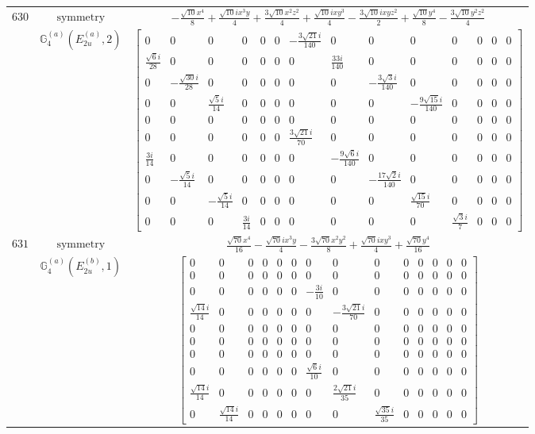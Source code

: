 \documentclass[fleqn,8pt,landscape]{jsarticle}
\begin{document}
\begin{longtable}{ccc}
$ 630 $ & $ \text{symmetry} $ & $ - \frac{\sqrt{10} x^{4}}{8} + \frac{\sqrt{10} i x^{3} y}{4} + \frac{3 \sqrt{10} x^{2} z^{2}}{4} + \frac{\sqrt{10} i x y^{3}}{4} - \frac{3 \sqrt{10} i x y z^{2}}{2} + \frac{\sqrt{10} y^{4}}{8} - \frac{3 \sqrt{10} y^{2} z^{2}}{4} $ \\
$  $ & $ \mathbb{G}_{4}^{(a)}(E_{2u}^{(a)},2) $ & $ \begin{bmatrix} 0 & 0 & 0 & 0 & 0 & 0 & - \frac{3 \sqrt{21} i}{140} & 0 & 0 & 0 & 0 & 0 & 0 & 0 \\ \frac{\sqrt{6} i}{28} & 0 & 0 & 0 & 0 & 0 & 0 & \frac{33 i}{140} & 0 & 0 & 0 & 0 & 0 & 0 \\ 0 & - \frac{\sqrt{30} i}{28} & 0 & 0 & 0 & 0 & 0 & 0 & - \frac{3 \sqrt{3} i}{140} & 0 & 0 & 0 & 0 & 0 \\ 0 & 0 & \frac{\sqrt{5} i}{14} & 0 & 0 & 0 & 0 & 0 & 0 & - \frac{9 \sqrt{15} i}{140} & 0 & 0 & 0 & 0 \\ 0 & 0 & 0 & 0 & 0 & 0 & 0 & 0 & 0 & 0 & 0 & 0 & 0 & 0 \\ 0 & 0 & 0 & 0 & 0 & 0 & \frac{3 \sqrt{21} i}{70} & 0 & 0 & 0 & 0 & 0 & 0 & 0 \\ \frac{3 i}{14} & 0 & 0 & 0 & 0 & 0 & 0 & - \frac{9 \sqrt{6} i}{140} & 0 & 0 & 0 & 0 & 0 & 0 \\ 0 & - \frac{\sqrt{5} i}{14} & 0 & 0 & 0 & 0 & 0 & 0 & - \frac{17 \sqrt{2} i}{140} & 0 & 0 & 0 & 0 & 0 \\ 0 & 0 & - \frac{\sqrt{5} i}{14} & 0 & 0 & 0 & 0 & 0 & 0 & \frac{\sqrt{15} i}{70} & 0 & 0 & 0 & 0 \\ 0 & 0 & 0 & \frac{3 i}{14} & 0 & 0 & 0 & 0 & 0 & 0 & \frac{\sqrt{3} i}{7} & 0 & 0 & 0 \end{bmatrix} $ \\ \hline
$ 631 $ & $ \text{symmetry} $ & $ \frac{\sqrt{70} x^{4}}{16} - \frac{\sqrt{70} i x^{3} y}{4} - \frac{3 \sqrt{70} x^{2} y^{2}}{8} + \frac{\sqrt{70} i x y^{3}}{4} + \frac{\sqrt{70} y^{4}}{16} $ \\
$  $ & $ \mathbb{G}_{4}^{(a)}(E_{2u}^{(b)},1) $ & $ \begin{bmatrix} 0 & 0 & 0 & 0 & 0 & 0 & 0 & 0 & 0 & 0 & 0 & 0 & 0 & 0 \\ 0 & 0 & 0 & 0 & 0 & 0 & 0 & 0 & 0 & 0 & 0 & 0 & 0 & 0 \\ 0 & 0 & 0 & 0 & 0 & 0 & - \frac{3 i}{10} & 0 & 0 & 0 & 0 & 0 & 0 & 0 \\ \frac{\sqrt{14} i}{14} & 0 & 0 & 0 & 0 & 0 & 0 & - \frac{3 \sqrt{21} i}{70} & 0 & 0 & 0 & 0 & 0 & 0 \\ 0 & 0 & 0 & 0 & 0 & 0 & 0 & 0 & 0 & 0 & 0 & 0 & 0 & 0 \\ 0 & 0 & 0 & 0 & 0 & 0 & 0 & 0 & 0 & 0 & 0 & 0 & 0 & 0 \\ 0 & 0 & 0 & 0 & 0 & 0 & 0 & 0 & 0 & 0 & 0 & 0 & 0 & 0 \\ 0 & 0 & 0 & 0 & 0 & 0 & \frac{\sqrt{6} i}{10} & 0 & 0 & 0 & 0 & 0 & 0 & 0 \\ \frac{\sqrt{14} i}{14} & 0 & 0 & 0 & 0 & 0 & 0 & \frac{2 \sqrt{21} i}{35} & 0 & 0 & 0 & 0 & 0 & 0 \\ 0 & \frac{\sqrt{14} i}{14} & 0 & 0 & 0 & 0 & 0 & 0 & \frac{\sqrt{35} i}{35} & 0 & 0 & 0 & 0 & 0 \end{bmatrix} $ \\ \hline

\end{longtable}
\end{document}
